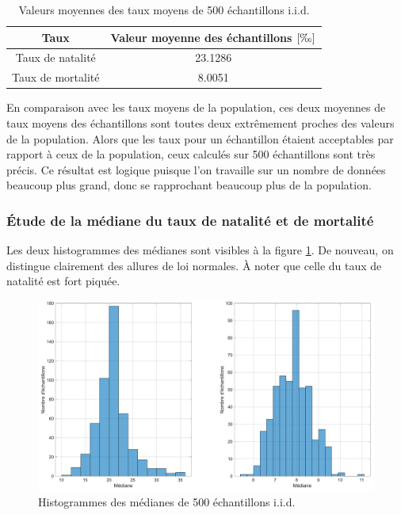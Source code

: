 \documentclass[a4paper, 12pt]{article}
\begin{document}
	\begin{table}[!ht]
	    \centering
	    \begin{tabular}{|c|c|}
	        \hline
	        \textbf{Taux} & \textbf{Valeur moyenne des échantillons} \(\left [\text{\textperthousand} \right ]\)\\ \hline
	        \hline
	        Taux de natalité & \num{23.1286}\\ \hline
	        Taux de mortalité & \num{8.0051}\\ \hline
	    \end{tabular}
	    \caption{Valeurs moyennes des taux moyens de 500 échantillons i.i.d.}
	    \label{tab:Q2bi}
	\end{table}
	
	En comparaison avec les taux moyens de la population, ces deux moyennes de taux moyens des échantillons sont toutes deux extrêmement proches des valeurs de la population. Alors que les taux pour un échantillon étaient acceptables par rapport à ceux de la population, ceux calculés sur \num{500} échantillons sont très précis. Ce résultat est logique puisque l'on travaille sur un nombre de données beaucoup plus grand, donc se rapprochant beaucoup plus de la population.
	
	\subsubsection{Étude de la médiane du taux de natalité et de mortalité}
	Les deux histogrammes des médianes sont visibles à la figure \ref{fig:Q2bii}. De nouveau, on distingue clairement des allures de loi normales. À noter que celle du taux de natalité est fort piquée.
	
	\begin{figure}[!ht]
	    \centering
	    \includegraphics[width=\textwidth]{resources/pdf/figures/Q2bii.pdf}
	    \caption{Histogrammes des médianes de 500 échantillons i.i.d.}
	    \label{fig:Q2bii}
	\end{figure}
	
\end{document}
